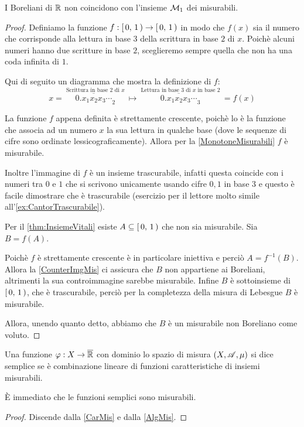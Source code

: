 \begin{proposition}\label{prop:BorelianiNonMisurabili2}
	I Boreliani di $\mathbb R$ non coincidono con l'insieme $\mathcal M_1$ dei misurabili.
\end{proposition}
\begin{proof}
	Definiamo la funzione $f:\left[\,0,\,1\,\right)\to \left[\,0,\,1\,\right)$ in modo che $f(x)$ sia il numero che corrisponde alla lettura in base $3$ della scrittura in base $2$ di $x$.
	Poichè alcuni numeri hanno due scritture in base $2$, sceglieremo sempre quella che non ha una coda infinita di $1$.
	
	Qui di seguito un diagramma che mostra la definizione di $f$:
	\begin{equation*}
		x=\>\stackrel{\text{Scrittura in base $2$ di $x$}}{\overline{0.x_1x_2x_3\cdots}_2} \>  \longmapsto
		\> \stackrel{\text{Lettura in base $3$ di $x$ in base $2$}}{\overline{0.x_1x_2x_3\cdots}_3}\>=f(x)
	\end{equation*}

	La funzione $f$ appena definita è strettamente crescente, poichè lo è la funzione che associa ad un numero $x$ la sua lettura in qualche base (dove le sequenze di cifre sono ordinate lessicograficamente). Allora per la \cref{MonotoneMisurabili} $f$ è misurabile.
	
	Inoltre l'immagine di $f$ è un insieme trascurabile, infatti questa coincide con i numeri tra $0$ e $1$ che si scrivono unicamente usando cifre $0,1$ in base $3$ e questo è facile dimostrare che è trascurabile (esercizio per il lettore molto simile all'\cref{ex:CantorTrascurabile}).
	
	Per il \cref{thm:InsiemeVitali} esiste $A\subseteq \left[\,0,\,1\,\right)$ che non sia misurabile.
	Sia $B=f(A)$.
	
	Poichè $f$ è strettamente crescente è in particolare iniettiva e perciò $A=f^{-1}(B)$.
	Allora la \cref{CounterImgMis} ci assicura che $B$ non appartiene ai Boreliani, altrimenti la sua controimmagine sarebbe misurabile. 
	Infine $B$ è sottoinsieme di $\left[\,0,\,1\,\right)$, che è trascurabile, perciò per la completezza della misura di Lebesgue $B$ è misurabile.
	
	Allora, unendo quanto detto, abbiamo che $B$ è un misurabile non Boreliano come voluto.
\end{proof}



\begin{definition}
	Una funzione $\varphi:X \rightarrow \overline{\mathbb R}$ con dominio lo spazio di misura $(X,\mathscr A,\mu)$ si dice semplice se è combinazione lineare di
	funzioni caratteristiche di insiemi misurabili.
\end{definition}
\begin{remark}
	È immediato che le funzioni semplici sono misurabili.
\end{remark}
\begin{proof}
	Discende dalla \cref{CarMis} e dalla \cref{AlgMis}.
\end{proof}


